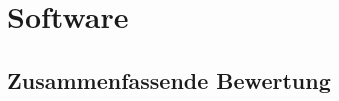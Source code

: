 \chapter{Software}
\label{sec:software}

\section{Zusammenfassende Bewertung}
\label{sec:überschrift}